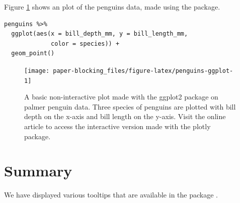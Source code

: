 Figure \ref{fig:penguins-ggplot} shows an plot of the penguins data, made using the  package.

\begin{verbatim}
penguins %>% 
  ggplot(aes(x = bill_depth_mm, y = bill_length_mm, 
             color = species)) + 
  geom_point()
\end{verbatim}

\begin{figure}
\texttt{[image: paper-blocking\_files/figure-latex/penguins-ggplot-1]} \caption{A basic non-interactive plot made with the ggplot2 package on palmer penguin data. Three species of penguins are plotted with bill depth on the x-axis and bill length on the y-axis. Visit the online article to access the interactive version made with the plotly package.}\label{fig:penguins-ggplot}
\end{figure}

\section{Summary}\label{summary}

We have displayed various tooltips that are available in the package .



\address{%
Quietest Quokka\\
University of Little Mates\\%
Department of Letter Q\\ Somewhere, Australia\\
%
\url{https://www.britannica.com/animal/quokka}\\%
\textit{ORCiD: \href{https://orcid.org/0000-1721-1511-1101}{0000-1721-1511-1101}}\\%
\href{mailto:qquo@ulm.edu}{\nolinkurl{qquo@ulm.edu}}%
}

\address{%
Bounciest Bilby\\
University of Little MatesUniversity of Aussie Animals\\%
Department of Letter Q, Somewhere, Australia\\ Department of Marsupials, Somewhere, Australia\\
%
\url{https://www.britannica.com/animal/bilby}\\%
\textit{ORCiD: \href{https://orcid.org/0000-0002-0912-0225}{0000-0002-0912-0225}}\\%
\href{mailto:bbil@ulm.edu}{\nolinkurl{bbil@ulm.edu}}%
}
